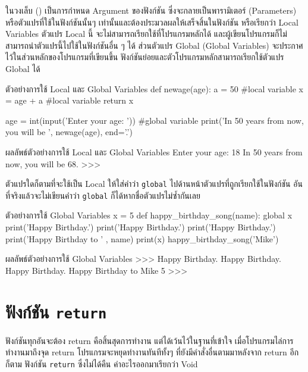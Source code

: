 ในวงเล็บ () เป็นการกำหนด Argument ของฟังก์ชัน ซึ่งจะกลายเป็นพารามิเตอร์ (Parameters) หรือตัวแปรที่ใช้ในฟังก์ชันนั้นๆ เท่านั้นและต้องประมวลผลให้เสร็จสิ้นในฟังก์ชัน หรือเรียกว่า Local Variables ตัวแปร Local นี้ จะไม่สามารถเรียกใช้ที่โปรแกรมหลักได้ และผู้เขียนโปรแกรมก็ไม่สามารถนำตัวแปรนี้ไปใช้ในฟังก์ชันอื่น ๆ ได้ ส่วนตัวแปร Global (Global Variables) จะประกาศไว้ในส่วนหลักของโปรแกรมที่เขียนขึ้น ฟังก์ชันย่อยและตัวโปรแกรมหลักสามารถเรียกใช้ตัวแปร Global ได้

\begin{codelist}{ตัวอย่างการใช้ Local และ Global Variables}{}
def newage(age):
    a = 50 #local variable
    x = age + a #local variable
    return x

age = int(input('Enter your age: ')) #global variable
print('In 50 years from now, you will be ', newage(age), end='.')
\end{codelist}

\begin{codelist}{ผลลัพธ์ตัวอย่างการใช้ Local และ Global Variables}{}
Enter your age: 18
In 50 years from now, you will be  68.
>>> 
\end{codelist}


ตัวแปรใดก็ตามที่จะใช้เป็น Local ให้ใส่คำว่า \texttt{global} ไปด้านหน้าตัวแปรที่ถูกเรียกใช้ในฟังก์ชัน อันที่จริงแล้วจะไม่เขียนคำว่า \texttt{global}  ก็ได้หากชื่อตัวแปรไม่ซ้ำกันเลย

\begin{codelist}{ตัวอย่างการใช้ Global Variables}{}
x = 5
def happy_birthday_song(name):
    global x
    print('Happy Birthday.')
    print('Happy Birthday.')
    print('Happy Birthday.')
    print('Happy Birthday to ' , name)
    print(x)
happy_birthday_song('Mike')
\end{codelist}

\begin{codelist}{ผลลัพธ์ตัวอย่างการใช้ Global Variables}{}
>>>
Happy Birthday.
Happy Birthday.
Happy Birthday.
Happy Birthday to Mike
5
>>>
\end{codelist}

\section{ฟังก์ชัน \texttt{return}}

ฟังก์ชันทุกอันจะต้อง return คือสิ้นสุดการทำงาน แต่ได้เว้นไว้ในฐานที่เข้าใจ เมื่อโปรแกรมไล่การทำงานมาถึงจุด return โปรแกรมจะหยุดทำงานทันทีทั้งๆ ที่ยังมีคำสั่งอื่นตามมาหลังจาก return อีกก็ตาม  ฟังก์ชัน \texttt{return} ซึ่งไม่ได้คืน ค่าอะไรออกมาเรียกว่า Void 

